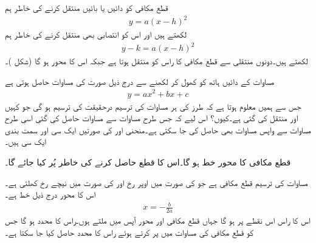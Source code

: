 
قطع مکافی  کو دائیں یا بائیں منتقل کرنے کی خاطر ہم
\begin{align}
y=a(x-h)^2
\end{align}
لکھتے ہیں اور اس کو انتصابی بھی منتقل کرنے کی خاطر ہم
\begin{align}\label{مساوات_ابتدا_دو_درجی_الف}
y-k=a(x-h)^2
\end{align}
لکھتے ہیں۔دونوں منتقلی سے قطع مکافی کا  راس  کو منتقل ہوتا  ہے جبکہ اس کا محور  ہو گا (شکل )۔

مساوات  کے دائیں ہاتھ کو کھول کر لکھنے سے درج ذیل صورت کی مساوات حاصل ہوتی ہے
\begin{align}\label{مساوات_ابتدا_دو_درجی_ب}
y=ax^2+bx+c
\end{align}
جس سے ہمیں معلوم ہوتا ہے کہ  طرز کی ہر مساوات کی ترسیم  درحقیقت  کی ترسیم ہو گی جو کہیں اور منتقل کی گئی ہے۔کیوں؟ اس لیے کہ جس طرح مساوات  سے مساوات  حاصل کی گئی اسی طرح  مساوات  سے واپس   مساوات  بھی حاصل کی  جا سکتی ہے۔منحنی  اور  کی صورتیں ایک سی  اور سمت بندی ایک سی ہیں۔

قطع مکافی  کا محور خط  ہو گا۔اس کا قطع  حاصل کرنے کی خاطر  پُر کیا جائے گا۔

\quad 
مساوات  کی ترسیم قطع مکافی ہے جو  کی صورت میں اوپر رخ اور  کی صورت میں نیچے رخ کھلتی  ہے۔اس کا  محور درج ذیل خط ہے۔
\begin{align}
x=-\frac{b}{2a}
\end{align} 
اس کا  راس اس نقطے پر ہو گا جہاں قطع مکافی اور محور آپس میں ملتے ہوں۔راس کا  محدد  ہو گا جس کو قطع مکافی کی مساوات میں پر کرتے ہوئے راس کا  محدد حاصل کیا جا سکتا ہے۔

